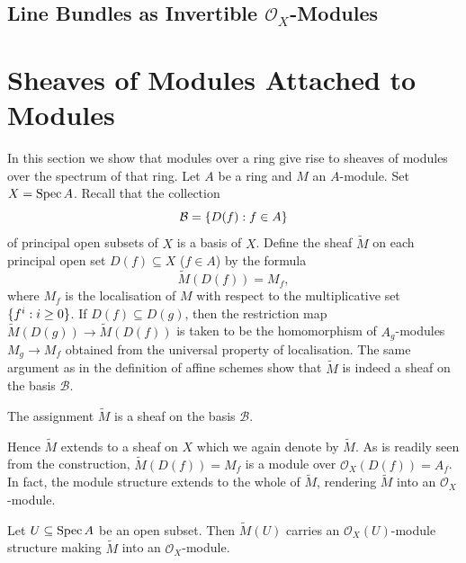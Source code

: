 \subsection*{Line Bundles as Invertible $\mathcal{O}_X$-Modules}


\section{Sheaves of Modules Attached to Modules}

In this section we show that modules over a ring give rise to sheaves of modules over the spectrum of that ring. Let $A$ be a ring and $M$ an $A$-module. Set $X = \operatorname{Spec} A$. Recall that the collection
\begin{equation*}
	\mathcal{B} = \lbrace D(f) : f \in A\rbrace
\end{equation*} 
of principal open subsets of $X$ is a basis of $X$. Define the sheaf $\tilde{M}$ on each principal open set $D(f) \subseteq X$ ($f \in A$) by the formula
\begin{equation*}
	\tilde{M}(D(f)) = M_f,
\end{equation*}
where $M_f$ is the localisation of $M$ with respect to the multiplicative set $\lbrace f^i : i \geq 0\rbrace$. If $D(f) \subseteq D(g)$, then the restriction map $\tilde{M}(D(g)) \to \tilde{M}(D(f))$ is taken to be the homomorphism of $A_g$-modules $M_g \to M_f$ obtained from the universal property of localisation. The same argument as in the definition of affine schemes show that $\tilde{M}$ is indeed a sheaf on the basis $\mathcal{B}$. 

\begin{exercise}
	The assignment $\tilde{M}$ is a sheaf on the basis $\mathcal{B}$.
\end{exercise}

Hence $\tilde{M}$ extends to a sheaf on $X$ which we again denote by $\tilde{M}$. As is readily seen from the construction, $\tilde{M}(D(f)) = M_f$ is a module over $\mathcal{O}_X(D(f)) = A_f$. In fact, the module structure extends to the whole of $\tilde{M}$, rendering $\tilde{M}$ into an $\mathcal{O}_X$-module.

\begin{lemma}
	Let $U \subseteq \operatorname{Spec} A$ be an open subset. Then $\tilde{M}(U)$ carries an $\mathcal{O}_X(U)$-module structure making $\tilde{M}$ into an $\mathcal{O}_X$-module.
\end{lemma}

